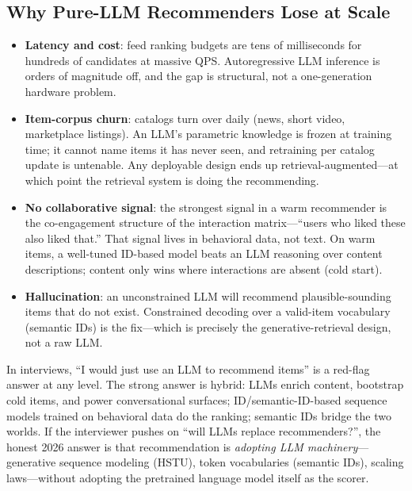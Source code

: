 \subsection{Why Pure-LLM Recommenders Lose at Scale}

\begin{itemize}
    \item \textbf{Latency and cost}: feed ranking budgets are tens of milliseconds for hundreds of candidates at massive QPS. Autoregressive LLM inference is orders of magnitude off, and the gap is structural, not a one-generation hardware problem.
    \item \textbf{Item-corpus churn}: catalogs turn over daily (news, short video, marketplace listings). An LLM's parametric knowledge is frozen at training time; it cannot name items it has never seen, and retraining per catalog update is untenable. Any deployable design ends up retrieval-augmented---at which point the retrieval system is doing the recommending.
    \item \textbf{No collaborative signal}: the strongest signal in a warm recommender is the co-engagement structure of the interaction matrix---``users who liked these also liked that.'' That signal lives in behavioral data, not text. On warm items, a well-tuned ID-based model beats an LLM reasoning over content descriptions; content only wins where interactions are absent (cold start).
    \item \textbf{Hallucination}: an unconstrained LLM will recommend plausible-sounding items that do not exist. Constrained decoding over a valid-item vocabulary (semantic IDs) is the fix---which is precisely the generative-retrieval design, not a raw LLM.
\end{itemize}

\begin{warningbox}
In interviews, ``I would just use an LLM to recommend items'' is a red-flag answer at any level. The strong answer is hybrid: LLMs enrich content, bootstrap cold items, and power conversational surfaces; ID/semantic-ID-based sequence models trained on behavioral data do the ranking; semantic IDs bridge the two worlds. If the interviewer pushes on ``will LLMs replace recommenders?'', the honest 2026 answer is that recommendation is \textit{adopting LLM machinery}---generative sequence modeling (HSTU), token vocabularies (semantic IDs), scaling laws---without adopting the pretrained language model itself as the scorer.
\end{warningbox}

